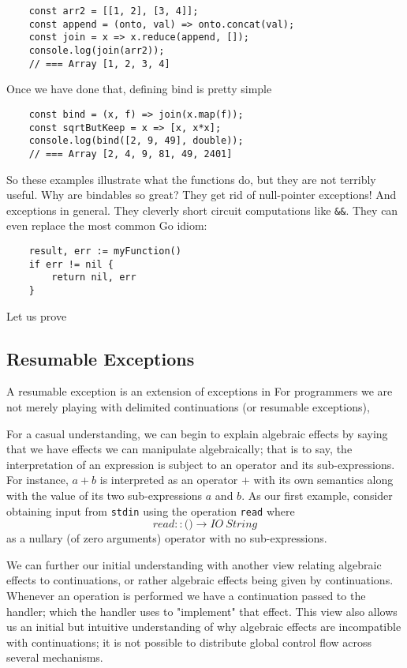 \begin{verbatim}
    const arr2 = [[1, 2], [3, 4]];
    const append = (onto, val) => onto.concat(val);
    const join = x => x.reduce(append, []);
    console.log(join(arr2));
    // === Array [1, 2, 3, 4]
\end{verbatim}
Once we have done that, defining bind is pretty simple
\begin{verbatim}
    const bind = (x, f) => join(x.map(f));
    const sqrtButKeep = x => [x, x*x];
    console.log(bind([2, 9, 49], double));
    // === Array [2, 4, 9, 81, 49, 2401]
\end{verbatim}

So these examples illustrate what the functions do,
but they are not terribly useful.
Why are bindables so great?
They get rid of null-pointer exceptions!
And exceptions in general.
They cleverly short circuit computations like \texttt{\&\&}.
They can even replace the most common Go idiom:
\begin{verbatim}
    result, err := myFunction()
    if err != nil {
        return nil, err
    }
\end{verbatim}

Let us prove

\subsection{Resumable Exceptions}
A resumable exception is an extension of
exceptions in 
For programmers
we are not merely playing with delimited continuations (or resumable exceptions),

For a casual understanding,
we can begin to explain algebraic effects by saying that
we have effects we can manipulate algebraically; that is to say,
the interpretation of an expression is
subject to an operator and its sub-expressions.
For instance, $a + b$ is interpreted as an operator
$+$ with its own semantics along with the value of its
two sub-expressions $a$ and $b$.
As our first example, consider obtaining input from
\texttt{stdin} using the operation \texttt{read} where
\begin{equation}
    read :: \texttt{()} \rightarrow IO\ String
\end{equation}
as a nullary (of zero arguments) operator with no sub-expressions.

We can further our initial understanding with another view
relating algebraic effects to continuations,
or rather algebraic effects being given by continuations.
Whenever an operation is performed we have a continuation
passed to the handler;
which the handler uses to "implement" that effect.
This view also allows us an initial but intuitive
understanding of why algebraic effects are incompatible with continuations;
it is not possible to distribute global control flow across several mechanisms.


